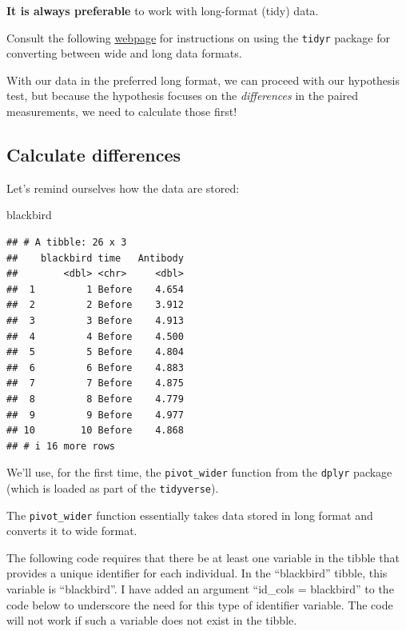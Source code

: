 \documentclass[
]{book}
\newenvironment{Shaded}{\begin{snugshade}}{\end{snugshade}}
\newcommand{\NormalTok}[1]{#1}
\begin{document}
\textbf{It is always preferable} to work with long-format (tidy) data.

Consult the following \href{http://www.cookbook-r.com/Manipulating_data/Converting_data_between_wide_and_long_format/}{webpage} for instructions on using the \texttt{tidyr} package for converting between wide and long data formats.

With our data in the preferred long format, we can proceed with our hypothesis test, but because the hypothesis focuses on the \emph{differences} in the paired measurements, we need to calculate those first!

\subsection{Calculate differences}\label{calc_diffs}

Let's remind ourselves how the data are stored:

\begin{Shaded}
\begin{Highlighting}[]
\NormalTok{blackbird}
\end{Highlighting}
\end{Shaded}

\begin{verbatim}
## # A tibble: 26 x 3
##    blackbird time   Antibody
##        <dbl> <chr>     <dbl>
##  1         1 Before    4.654
##  2         2 Before    3.912
##  3         3 Before    4.913
##  4         4 Before    4.500
##  5         5 Before    4.804
##  6         6 Before    4.883
##  7         7 Before    4.875
##  8         8 Before    4.779
##  9         9 Before    4.977
## 10        10 Before    4.868
## # i 16 more rows
\end{verbatim}

We'll use, for the first time, the \texttt{pivot\_wider} function from the \texttt{dplyr} package (which is loaded as part of the \texttt{tidyverse}).

The \texttt{pivot\_wider} function essentially takes data stored in long format and converts it to wide format.

The following code requires that there be at least one variable in the tibble that provides a unique identifier for each individual. In the ``blackbird'' tibble, this variable is ``blackbird''. I have added an argument ``id\_cols = blackbird'' to the code below to underscore the need for this type of identifier variable. The code will not work if such a variable does not exist in the tibble.
\end{document}
